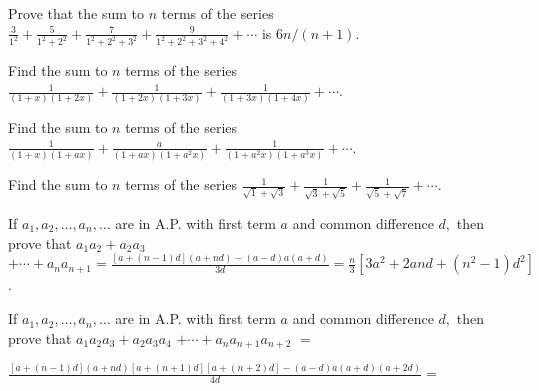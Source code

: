\item Prove that the sum to $n$ terms of the series $\frac{3}{1^2} + \frac{5}{1^2 + 2^2} + \frac{7}{1^2 + 2^2 + 3^2} +
  \frac{9}{1^2 + 2^2 + 3^2 + 4^2} + \cdots$ is $6n/(n + 1)$.
\item Find the sum to $n$ terms of the series $\frac{1}{(1 + x)(1 + 2x)} + \frac{1}{(1 + 2x)(1 + 3x)} + \frac{1}{(1 +
  3x)(1 + 4x)} + \cdots$.
\item Find the sum to $n$ terms of the series $\frac{1}{(1 + x)(1 + ax)} + \frac{a}{(1 + ax)(1 + a^2x)} + \frac{1}{(1 +
  a^2x)(1 + a^3x)} + \cdots$.
\item Find the sum to $n$ terms of the series $\frac{1}{\sqrt{1} + \sqrt{3}} + \frac{1}{\sqrt{3} + \sqrt{5}} +
  \frac{1}{\sqrt{5} + \sqrt{7}} + \cdots$.
\item If $a_1, a_2, \ldots, a_n, \ldots$ are in A.P. with first term $a$ and common difference $d,$ then prove that
  $a_1a_2 + a_2a_3$ $+ \cdots + a_na_{n +1} = \frac{[a + (n - 1)d](a + nd) - (a - d)a(a + d)}{3d} = \frac{n}{3}[3a^2 + 2and + (n^2
  - 1)d^2]$.
\item If $a_1, a_2, \ldots, a_n, \ldots$ are in A.P. with first term $a$ and common difference $d,$ then prove that
  $a_1a_2a_3 + a_2a_3a_4$ $+ \cdots + a_na_{n +1}a_{n + 2}$ $=$

  $\frac{[a + (n - 1)d](a + nd)[a + (n + 1)d][a + (n + 2)d] - (a -
  d)a(a + d)(a + 2d)}{4d}=$

